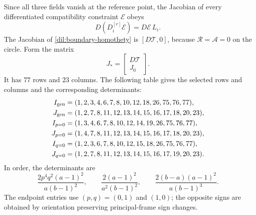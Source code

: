\documentclass[11pt,a4paper]{article}
\numberwithin{equation}{section}
\theoremstyle{plain}
\theoremstyle{definition}
\theoremstyle{remark}
\begin{document}
Since all three fields vanish at the reference point, the Jacobian of
every differentiated compatibility constraint $\mathcal E$ obeys
\begin{equation}\label{dil:linear-closure}
                     D(D_i^{[r]}\mathcal E)=D\mathcal E\,L_i.
\end{equation}
The Jacobian of \eqref{dil:boundary-homothety} is
$[D\mathcal T,0]$, because $\mathcal R=\mathcal A=0$ on the circle.
Form the matrix
\[
              J_*=\begin{bmatrix}D\mathcal T\\J_0\end{bmatrix}.
\]
It has $77$ rows and $23$ columns. The following table gives the selected
rows and columns and the corresponding determinants:
\begin{equation}\label{dil:carrier-minors}
\begin{aligned}
 I_{\rm gen}&=(1,2,3,4,6,7,8,10,12,18,26,75,76,77),\\
 J_{\rm gen}&=(1,2,7,8,11,12,13,14,15,16,17,18,20,23),\\
 I_{p=0}&=(1,3,4,6,7,8,10,12,14,19,26,75,76,77),\\
 J_{p=0}&=(1,4,7,8,11,12,13,14,15,16,17,18,20,23),\\
 I_{q=0}&=(1,2,3,6,7,8,10,12,15,18,26,75,76,77),\\
 J_{q=0}&=(1,2,7,8,11,12,13,14,15,16,17,19,20,23).
\end{aligned}
\end{equation}
In order, the determinants are
\begin{equation}\label{dil:carrier-determinants}
 \frac{2p^4q^2(a-1)^2}{a(b-1)^2},\qquad
 \frac{2(a-1)^2}{a^2(b-1)^2},\qquad
 \frac{2(b-a)(a-1)^2}{a(b-1)^3}.
\end{equation}
The endpoint entries use $(p,q)=(0,1)$ and $(1,0)$; the opposite signs
are obtained by orientation preserving principal-frame sign changes.
\end{document}
